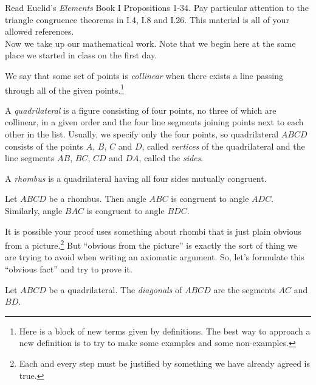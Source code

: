 Read Euclid's \emph{Elements} Book I Propositions 1-34.
Pay particular attention to the triangle congruence theorems in I.4, I.8 and I.26.
This material is all of your allowed references.\\

Now we take up our mathematical work. Note that we begin here at the same place we started in class on the first day.

\begin{definition}\label{defn:collinear}
We say that some set of points is \emph{collinear} when there exists a line passing through all of the given points.\footnote{Here is a block of new terms given by definitions.
The best way to approach a new definition is to try to make some examples and some non-examples.}
\end{definition}


\begin{definition}\label{defn:quadrilateral}
A \emph{quadrilateral} is a figure consisting of four points, no three of which are collinear, in a given order and the four line segments joining points next to each other in the list.
Usually, we specify only the four points, so quadrilateral $ABCD$ consists of the points $A$, $B$, $C$ and $D$, called \emph{vertices} of the quadrilateral and the line segments $AB$, $BC$, $CD$ and $DA$, called the \emph{sides}.
\end{definition}

\begin{definition}\label{defn:rhombus}
A \emph{rhombus} is a quadrilateral having all four sides mutually congruent.
\end{definition}

\begin{conjecture}\label{conj:rhombus-angles}
Let $ABCD$ be a rhombus. Then angle $ABC$ is congruent to angle $ADC$. Similarly, angle $BAC$ is congruent to angle $BDC$.
\end{conjecture}



It is possible your proof uses something about rhombi that is just plain obvious from a picture.\footnote{Each and every step must be justified by something we have already agreed is true.}
But ``obvious from the picture'' is exactly the sort of thing we are trying to avoid when writing an axiomatic argument.
So, let's formulate this ``obvious fact'' and try to prove it.


\begin{definition}\label{defn:diagonals}
Let $ABCD$ be a quadrilateral. The \emph{diagonals} of $ABCD$ are the segments $AC$ and $BD$.
\end{definition}

